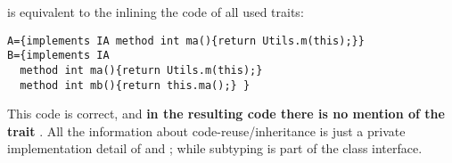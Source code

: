 \noindent is equivalent to the inlining the code of all used traits:
  
\saveSpace \begin{lstlisting}
A={implements IA method int ma(){return Utils.m(this);}}
B={implements IA
  method int ma(){return Utils.m(this);}
  method int mb(){return this.ma();} } 
 \end{lstlisting}
\saveSpace 
 This code is correct, and {\bf in the resulting code there is no mention of the trait
 \Q@ta@}. All the information about code-reuse/inheritance
  is just a private implementation detail of \Q@A@
 and \Q@B@; while subtyping is part of the class interface.







